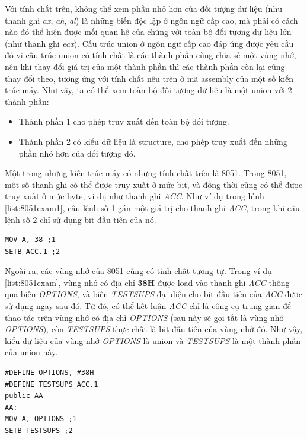 Với tính chất trên, không thể xem phần nhỏ hơn của đối tượng dữ liệu (như thanh ghi \textit{ax}, \textit{ah}, \textit{al}) là những biến độc lập ở ngôn ngữ cấp cao, mà phải có cách nào đó thể hiện được mối quan hệ của chúng với toàn bộ đối tượng dữ liệu lớn (như thanh ghi \textit{eax}). Cấu trúc union ở ngôn ngữ cấp cao đáp ứng được yêu cầu đó vì cấu trúc union có tính chất là các thành phần cùng chia sẻ một vùng nhớ, nên khi thay đổi giá trị của một thành phần thì các thành phần còn lại cũng thay đổi theo, tương ứng với tính chất nêu trên ở mã assembly của một số kiến trúc máy. Như vậy, ta có thể xem toàn bộ đối tượng dữ liệu là một union với 2 thành phần:
\begin{itemize}
	\item Thành phần 1 cho phép truy xuất đến toàn bộ đối tượng.
	\item Thành phần 2 có kiểu dữ liệu là structure, cho phép truy xuất đến những phần nhỏ hơn của đối tượng đó.
\end{itemize}

Một trong những kiến trúc máy có những tính chất trên là 8051. Trong 8051, một số thanh ghi có thể được truy xuất ở mức bit, và đồng thời cũng có thể được truy xuất ở mức byte, ví dụ như thanh ghi \textit{ACC}. Như ví dụ trong hình \ref{list:8051exam1}, câu lệnh số 1 gán một giá trị cho thanh ghi \textit{ACC}, trong khi câu lệnh số 2 chỉ sử dụng bit đầu tiên của nó.

\begin{lstlisting}[caption={Đoạn mã 8051 sử dụng thanh ghi ACC ở nhiều cấp độ},label={list:8051exam1}]
MOV A, 38 ;1
SETB ACC.1 ;2
\end{lstlisting}

Ngoài ra, các vùng nhớ của 8051 cũng có tính chất tương tự. Trong ví dụ \ref{list:8051exam}, vùng nhớ có địa chỉ \textbf{38H} được load vào thanh ghi \textit{ACC} thông qua biến \textit{OPTIONS}, và biến \textit{TESTSUPS} đại diện cho bit đầu tiên của \textit{ACC} được sử dụng ngay sau đó. Từ đó, có thể kết luận \textit{ACC} chỉ là công cụ trung gian để thao tác trên vùng nhớ có địa chỉ \textit{OPTIONS} (sau này sẽ gọi tắt là vùng nhớ \textit{OPTIONS}), còn \textit{TESTSUPS} thực chất là bit đầu tiên của vùng nhớ đó. Như vậy, kiểu dữ liệu của vùng nhớ \textit{OPTIONS} là union và \textit{TESTSUPS} là một thành phần của union này.
\begin{lstlisting}[caption={Đoạn mã 8051 có một vùng nhớ mang kiểu union},label={list:8051exam}]
#DEFINE OPTIONS, #38H
#DEFINE TESTSUPS ACC.1
public AA
AA:
MOV A, OPTIONS ;1
SETB TESTSUPS ;2
\end{lstlisting}

